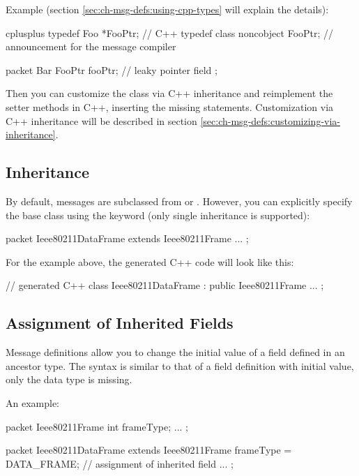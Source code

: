 Example (section \ref{sec:ch-msg-defs:using-cpp-types} will explain the
details):

\begin{msg}
cplusplus {{ typedef Foo *FooPtr; }} // C++ typedef
class noncobject FooPtr; // announcement for the message compiler

packet Bar
{
    FooPtr fooPtr;  // leaky pointer field
};
\end{msg}

Then you can customize the class via C++ inheritance and reimplement
the setter methods in C++, inserting the missing  statements.
Customization via C++ inheritance will be described in section
\ref{sec:ch-msg-defs:customizing-via-inheritance}.


\subsection{Inheritance}
\label{sec:ch-msg-defs:inheritance}

By default, messages are subclassed from  or
. However, you can explicitly specify the base class using
the  keyword (only single inheritance is supported):

\begin{msg}
packet Ieee80211DataFrame extends Ieee80211Frame
{
    ...
};
\end{msg}

For the example above, the generated C++ code will look like this:

\begin{cpp}
// generated C++
class Ieee80211DataFrame : public Ieee80211Frame {
    ...
};
\end{cpp}


\subsection{Assignment of Inherited Fields}
\label{sec:ch-msg-defs:assignment-of-inherited-fields}

Message definitions allow you to change the initial value of a field
defined in an ancestor type. The syntax is similar to that of a field
definition with initial value, only the data type is missing.

An example:

\begin{msg}
packet Ieee80211Frame
{
    int frameType;
    ...
};

packet Ieee80211DataFrame extends Ieee80211Frame
{
    frameType = DATA_FRAME;  // assignment of inherited field
    ...
};
\end{msg}

